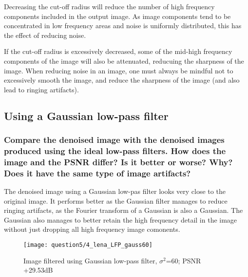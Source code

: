 Decreasing the cut-off radius will reduce the number of high frequency components included in the output image. As image components tend to be concentrated in low frequency areas and noise is uniformly distributed, this has the effect of reducing noise.

If the cut-off radius is excessively decreased, some of the mid-high frequency components of the image will also be attenuated, reducuing the sharpness of the image. When reducing noise in an image, one must always be mindful not to excessively smooth the image, and reduce the sharpness of the image (and also lead to ringing artifacts).

\clearpage
\subsection{Using a Gaussian low-pass filter}

\subsubsection{Compare the denoised image with the denoised images produced using the ideal low-pass filters. How does the image and the PSNR differ? Is it better or worse? Why? Does it have the same type of image artifacts?}

The denoised image using a Gaussian low-pas filter looks very close to the original image. It performs better as the Gaussian filter manages to reduce ringing artifacts, as the Fourier transform of a Gaussian is also a Gaussian. The Gaussian also manages to better retain the high frequency detail in the image without just dropping all high frequency image comonents.


\begin{figure}[ht]
\centering
	\texttt{[image: question5/4\_lena\_LFP\_gauss60]}
	\caption{Image filtered using Gaussian low-pass filter, $\sigma^2$=60; PSNR +29.53dB}
\end{figure}